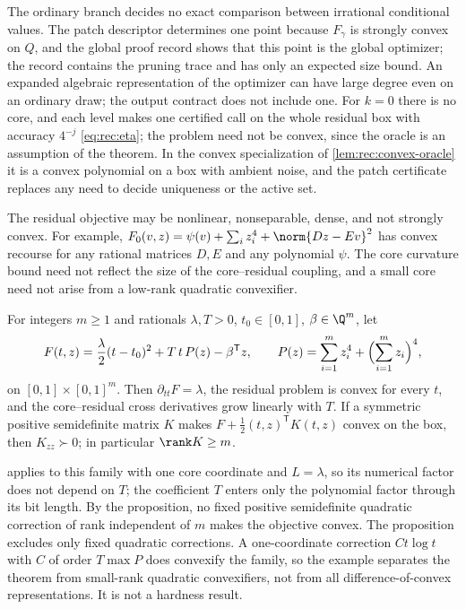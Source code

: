 The ordinary branch decides no exact comparison between irrational
conditional values. The patch descriptor determines one point because
$F_\gamma$ is strongly convex on $Q$, and the global proof record shows that
this point is the global optimizer; the record contains the pruning trace and
has only an expected size bound. An expanded algebraic representation of the
optimizer can have large degree even on an ordinary draw; the output contract
does not include one. For $k=0$ there is no core, and each level makes one
certified call on the whole residual box with accuracy $4^{-j}$
\eqref{eq:rec:eta}; the problem need not be convex, since the oracle is an
assumption of the theorem. In the convex specialization of
\cref{lem:rec:convex-oracle} it is a convex polynomial on a box with ambient
noise, and the patch certificate replaces any need to decide uniqueness or
the active set.

The residual objective may be nonlinear, nonseparable, dense, and not
strongly convex. For example,
$F_0(v,z)=\psi(v)+\sum_iz_i^4+\norm{Dz-Ev}^2$ has convex recourse for any
rational matrices $D,E$ and any polynomial $\psi$. The core curvature bound
need not reflect the size of the core--residual coupling, and a small core
need not arise from a low-rank quadratic convexifier.

\begin{proposition}\label{prop:rec:rank}
For integers $m\ge1$ and rationals $\lambda,T>0$, $t_0\in[0,1]$,
$\beta\in\Q^m$, let
\[
 F(t,z)=\frac\lambda2(t-t_0)^2+T\,t\,P(z)-\beta^{\mathsf T}z,\qquad
 P(z)=\sum_{i=1}^mz_i^4+\Bigl(\sum_{i=1}^mz_i\Bigr)^4,
\]
on $[0,1]\times[0,1]^m$. Then $\partial_{tt}F=\lambda$, the residual problem
is convex for every $t$, and the core--residual cross derivatives grow
linearly with $T$. If a symmetric positive semidefinite matrix $K$ makes
$F+\frac12(t,z)^{\mathsf T}K(t,z)$ convex on the box, then $K_{zz}\succ0$; in
particular $\rank K\ge m$.
\end{proposition}

 applies to this family with one core coordinate and
$L=\lambda$, so its numerical factor does not depend on $T$; the
coefficient $T$ enters only the polynomial factor through its bit length.
By the proposition, no fixed positive semidefinite quadratic correction of
rank independent of $m$ makes the objective convex. The proposition
excludes only fixed quadratic corrections. A one-coordinate correction
$Ct\log t$ with $C$ of order $T\max P$ does convexify the family, so the
example separates the theorem from small-rank quadratic convexifiers, not
from all difference-of-convex representations. It is not a hardness
result.

